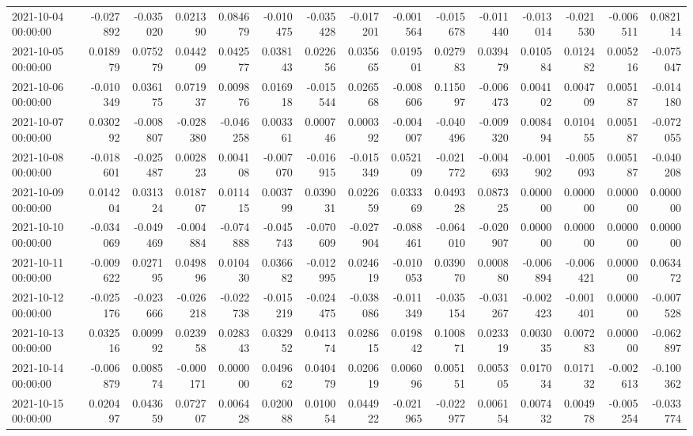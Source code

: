 \begin{tabular}{lrrrrrrrrrrrrrr}
2021-10-04 00:00:00 & -0.027892 & -0.035020 & 0.021390 & 0.084679 & -0.010475 & -0.035428 & -0.017201 & -0.001564 & -0.015678 & -0.011440 & -0.013014 & -0.021530 & -0.006511 & 0.082114 \\
2021-10-05 00:00:00 & 0.018979 & 0.075279 & 0.044209 & 0.042577 & 0.038143 & 0.022656 & 0.035665 & 0.019501 & 0.027983 & 0.039479 & 0.010584 & 0.012482 & 0.005216 & -0.075047 \\
2021-10-06 00:00:00 & -0.010349 & 0.036175 & 0.071937 & 0.009876 & 0.016918 & -0.015544 & 0.026568 & -0.008606 & 0.115097 & -0.006473 & 0.004102 & 0.004709 & 0.005187 & -0.014180 \\
2021-10-07 00:00:00 & 0.030292 & -0.008807 & -0.028380 & -0.046258 & 0.003361 & 0.000746 & 0.000392 & -0.004007 & -0.040496 & -0.009320 & 0.008494 & 0.010455 & 0.005187 & -0.072055 \\
2021-10-08 00:00:00 & -0.018601 & -0.025487 & 0.002823 & 0.004108 & -0.007070 & -0.016915 & -0.015349 & 0.052109 & -0.021772 & -0.004693 & -0.001902 & -0.005093 & 0.005187 & -0.040208 \\
2021-10-09 00:00:00 & 0.014204 & 0.031324 & 0.018707 & 0.011415 & 0.003799 & 0.039031 & 0.022659 & 0.033369 & 0.049328 & 0.087325 & 0.000000 & 0.000000 & 0.000000 & 0.000000 \\
2021-10-10 00:00:00 & -0.034069 & -0.049469 & -0.004884 & -0.074888 & -0.045743 & -0.070609 & -0.027904 & -0.088461 & -0.064010 & -0.020907 & 0.000000 & 0.000000 & 0.000000 & 0.000000 \\
2021-10-11 00:00:00 & -0.009622 & 0.027195 & 0.049896 & 0.010430 & 0.036682 & -0.012995 & 0.024619 & -0.010053 & 0.039070 & 0.000880 & -0.006894 & -0.006421 & 0.000000 & 0.063472 \\
2021-10-12 00:00:00 & -0.025176 & -0.023666 & -0.026218 & -0.022738 & -0.015219 & -0.024475 & -0.038086 & -0.011349 & -0.035154 & -0.031267 & -0.002423 & -0.001401 & 0.000000 & -0.007528 \\
2021-10-13 00:00:00 & 0.032516 & 0.009992 & 0.023958 & 0.028343 & 0.032952 & 0.041374 & 0.028615 & 0.019842 & 0.100871 & 0.023319 & 0.003035 & 0.007283 & 0.000000 & -0.062897 \\
2021-10-14 00:00:00 & -0.006879 & 0.008574 & -0.000171 & 0.000000 & 0.049662 & 0.040479 & 0.020619 & 0.006096 & 0.005151 & 0.005305 & 0.017034 & 0.017132 & -0.002613 & -0.100362 \\
2021-10-15 00:00:00 & 0.020497 & 0.043659 & 0.072707 & 0.006428 & 0.020088 & 0.010054 & 0.044922 & -0.021965 & -0.022977 & 0.006154 & 0.007432 & 0.004978 & -0.005254 & -0.033774 \\

\end{tabular}
